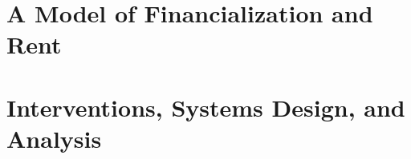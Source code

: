 \part{A Model of Financialization and Rent}








\part{Interventions, Systems Design, and Analysis}




\begin{comment}
TODO

- Glossary and symbols pages
- Index
- Move figures into seperate files, ideally one file per series, edit figrues
- Bibliography
- Website up

\end{comment}